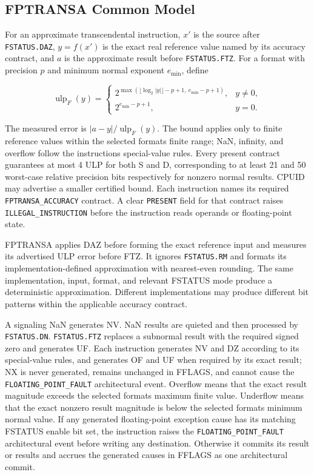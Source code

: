 \subsection{FPTRANSA Common Model}\label{section:fptransa-common-model}
For an approximate transcendental instruction, $x'$ is the source after \texttt{FSTATUS.DAZ}, $y=f(x')$ is the
exact real reference value named by its accuracy contract, and $a$ is the approximate result before
\texttt{FSTATUS.FTZ}. For a format with precision $p$ and minimum normal exponent $e_{\min}$, define

\[
  \operatorname{ulp}_F(y) =
  \begin{cases}
    2^{\max(\lfloor\log_2 |y|\rfloor-p+1,\ e_{\min}-p+1)}, & y\ne0,\\
    2^{e_{\min}-p+1}, & y=0.
  \end{cases}
\]

The measured error is $|a-y|/\operatorname{ulp}_F(y)$. The bound applies only to finite reference values within
the selected format\textquotesingle{}s finite range; NaN, infinity, and overflow follow the instruction\textquotesingle{}s special-value rules.
Every present contract guarantees at most 4 ULP for both S and D, corresponding to at least 21 and 50 worst-case
relative precision bits respectively for nonzero normal results. CPUID may advertise a smaller certified bound.
Each instruction names its required \texttt{FPTRANSA\_ACCURACY} contract. A clear \texttt{PRESENT} field for that
contract raises \texttt{ILLEGAL\_INSTRUCTION} before the instruction reads operands or floating-point state.

FPTRANSA applies DAZ before forming the exact reference input and measures its advertised ULP error before FTZ.
It ignores \texttt{FSTATUS.RM} and formats its implementation-defined approximation with nearest-even rounding.
The same implementation, input, format, and relevant FSTATUS mode produce a deterministic approximation.
Different implementations may produce different bit patterns within the applicable accuracy contract.

A signaling NaN generates NV. NaN results are quieted and then processed by \texttt{FSTATUS.DN}.
\texttt{FSTATUS.FTZ} replaces a subnormal result with the required signed zero and generates UF. Each instruction
generates NV and DZ according to its special-value rules, and generates OF and UF when required by its exact result;
NX is never generated, remains unchanged in FFLAGS, and cannot cause the \texttt{FLOATING\_POINT\_FAULT}
architectural event. Overflow means that the exact result magnitude exceeds the selected
format\textquotesingle{}s maximum finite value. Underflow means that the exact nonzero result magnitude is below the selected format\textquotesingle{}s
minimum normal value. If any generated floating-point exception cause has its matching FSTATUS enable bit set, the
instruction raises the \texttt{FLOATING\_POINT\_FAULT} architectural event before writing any destination. Otherwise
it commits its result or results and accrues the generated causes in FFLAGS as one architectural commit.

\clearpage
